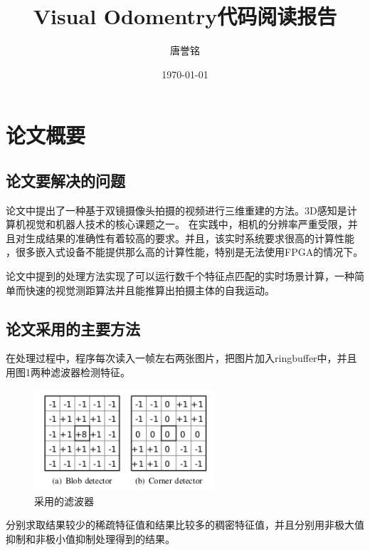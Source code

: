 \documentclass[UTF8]{ctexart}
\title{Visual Odomentry代码阅读报告}
\author{唐誉铭}
\date{\today}
\begin{document}
	\maketitle
	\section{论文概要}
	\subsection{论文要解决的问题}
    论文中提出了一种基于双镜摄像头拍摄的视频进行三维重建的方法。3D感知是计算机视觉和机器人技术的核心课题之一。
    在实践中，相机的分辨率严重受限，并且对生成结果的准确性有着较高的要求。并且，该实时系统要求很高的计算性能
    ，很多嵌入式设备不能提供那么高的计算性能，特别是无法使用FPGA的情况下。

    论文中提到的处理方法实现了可以运行数千个特征点匹配的实时场景计算，一种简单而快速的视觉测距算法并且能推算出拍摄主体的自我运动。
    \subsection{论文采用的主要方法}
    在处理过程中，程序每次读入一帧左右两张图片，把图片加入ringbuffer中，并且用图1两种滤波器检测特征。
    \begin{figure}[H]
        \centering
        \includegraphics[width=0.6\textwidth]{img/filter.png} 
        \caption{采用的滤波器}
        \label{fig.1}
    \end{figure}
    分别求取结果较少的稀疏特征值和结果比较多的稠密特征值，并且分别用非极大值抑制和非极小值抑制处理得到的结果。
\end{document}
